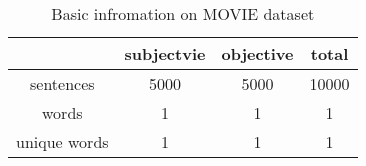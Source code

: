 \begin{table}[ht]
\caption{Basic infromation on MOVIE dataset}
\vspace{2mm}
\centering
\begin{tabu}{|c|c|c|c|}
\hline
& subjectvie & objective & total \\ \hline
sentences & 5000 & 5000 & 10000  \\ \hline
words & 1 & 1 & 1    		 \\ \hline
unique words &  1 & 1 &	 1	 \\ \hline
\end{tabu}
\end{table}